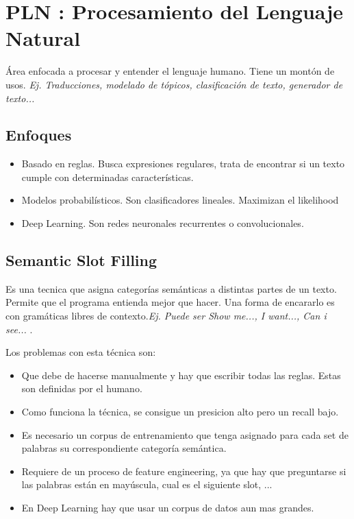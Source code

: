 \documentclass[titlepage,a4paper]{article}
\begin{document}
\newpage

\section{PLN : Procesamiento del Lenguaje Natural}
Área enfocada a procesar y entender el lenguaje humano. Tiene un montón de usos. \textit{Ej. Traducciones, modelado de tópicos, clasificación de texto, generador de texto...}

\subsection{Enfoques}

\begin{itemize}
    \item Basado en reglas. Busca expresiones regulares, trata de encontrar si un texto cumple con determinadas características.
    \item Modelos probabilísticos. Son clasificadores lineales. Maximizan el likelihood
    \item Deep Learning. Son redes neuronales recurrentes o convolucionales.
\end{itemize}

\subsection{Semantic Slot Filling}
Es una tecnica que asigna categorías semánticas a distintas partes de un texto. Permite que el programa entienda mejor que hacer. Una forma de encararlo es con gramáticas libres de contexto.\textit{Ej. Puede ser Show me..., I want..., Can i see... }.

Los problemas con esta técnica son:
\begin{itemize}
\item Que debe de hacerse manualmente y hay que escribir todas las reglas. Estas son definidas por el humano.
\item Como funciona la técnica, se consigue un presicion alto pero un recall bajo. 
\item Es necesario un corpus de entrenamiento que tenga asignado para cada set de palabras su correspondiente categoría semántica.
\item Requiere de un proceso de feature engineering, ya que hay que preguntarse si las palabras están en mayúscula, cual es el siguiente slot, ...
\item En Deep Learning hay que usar un corpus de datos aun mas grandes.
\end{itemize}
\end{document}
